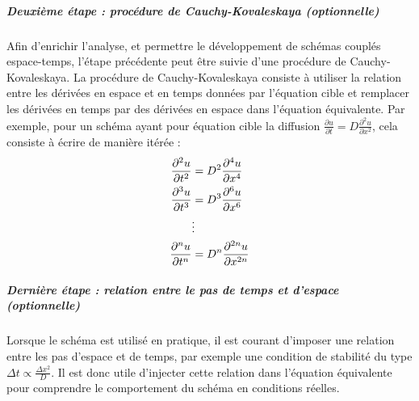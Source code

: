         \subparagraph{Deuxième étape : procédure de Cauchy-Kovaleskaya (optionnelle)}

        Afin d'enrichir l'analyse, et permettre le développement de schémas couplés espace-temps, l'étape précédente peut être suivie d'une procédure de Cauchy-Kovaleskaya.
        La procédure de Cauchy-Kovaleskaya consiste à utiliser la relation entre les dérivées en espace et en temps données par l'équation cible et remplacer les dérivées en temps par des dérivées en espace dans l'équation équivalente.
        Par exemple, pour un schéma ayant pour équation cible la diffusion $\frac{\partial u}{\partial t} = D \frac{\partial^2 u}{\partial x^2}$, cela consiste à écrire de manière itérée :
        \begin{align}
        \frac{\partial^2 u}{\partial t^2} &= D^2 \frac{\partial^4 u}{\partial x^4} \notag \\
        \frac{\partial^3 u}{\partial t^3} &= D^3 \frac{\partial^6 u}{\partial x^6} \notag \\
        &\vdots \notag \\
        \frac{\partial^n u}{\partial t^n} &= D^n \frac{\partial^{2n} u}{\partial x^{2n}}
        \end{align}

        \subparagraph{Dernière étape : relation entre le pas de temps et d'espace (optionnelle)}

        Lorsque le schéma est utilisé en pratique, il est courant d'imposer une relation entre les pas d'espace et de temps, par exemple une condition de stabilité du type
        $\Delta t \propto \frac{\Delta x^2}{D}$.
        Il est donc utile d'injecter cette relation dans l'équation équivalente pour comprendre le comportement du schéma en conditions réelles.